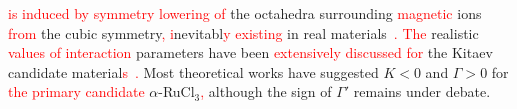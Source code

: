 \documentclass[twocolumn,superscriptaddress,showpacs, longbibliography, aps, prb]{revtex4-2}
\newcommand{\red}[1]{\textcolor{red}{#1}}
\begin{document}
\red{is induced by symmetry lowering of} 
the octahedra surrounding %
\red{magnetic} ions %
\red{from} the cubic symmetry\red{, %
i}nevitabl\red{y existing} %
in real materials\red{~\cite{Rau2014}.} %
\red{The} realistic \red{values of interaction} parameters have been %
\red{extensively discussed for} the Kitaev candidate material\red{s~\cite{Yamaji2016,Suzuki2018,laurell2020dynamical,Maksimov2020}.} %
Most theoretical works have suggested $K<0$ and $\Gamma>0$ for \red{the primary candidate} $\alpha$-RuCl$_3$\red{,} %
although the sign of $\Gamma'$ %
remains under debate.
\end{document}
